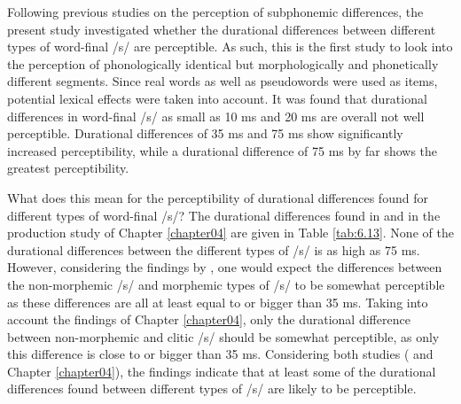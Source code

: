 Following previous studies on the perception of subphonemic differences, the present study investigated whether the durational differences between different types of word-final /s/ are perceptible. As such, this is the first study to look into the perception of phonologically identical but morphologically and phonetically different segments. Since real words as well as pseudowords were used as items, potential lexical effects were taken into account. It was found that durational differences in word-final /s/ as small as 10 ms and 20 ms are overall not well perceptible. Durational differences of 35 ms and 75 ms show significantly increased perceptibility, while a durational difference of 75 ms by far shows the greatest perceptibility.

What does this mean for the perceptibility of durational differences found for different types of word-final /s/? The durational differences found in \citet{Plag2017} and in the production study of Chapter \ref{chapter04} are given in Table \ref{tab:6.13}. None of the durational differences between the different types of /s/ is as high as 75 ms. However, considering the findings by \citet{Plag2017}, one would expect the differences between the non-morphemic /s/ and morphemic types of /s/ to be somewhat perceptible as these differences are all at least equal to or bigger than 35 ms. Taking into account the findings of Chapter \ref{chapter04}, only the durational difference between non-morphemic and clitic /s/ should be somewhat perceptible, as only this difference is close to or bigger than 35 ms. Considering both studies (\cite{Plag2017} and Chapter \ref{chapter04}), the findings indicate that at least some of the durational differences found between different types of /s/ are likely to be perceptible.

